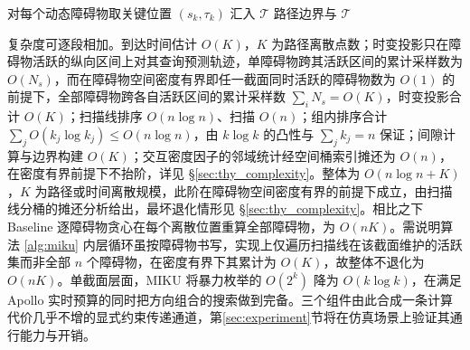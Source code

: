 \documentclass[a4paper,11pt]{ctexart}
\theoremstyle{definition}
\begin{document}
\begin{algorithm}[htbp]
\caption{MIKU 多障碍物统一规划求解}
\label{alg:miku}
对每个动态障碍物取关键位置 $(s_k, \tau_k)$ 汇入 $\mathcal{T}$\;
\KwRet 路径边界与 $\mathcal{T}$
\end{algorithm}

复杂度可逐段相加。到达时间估计 $O(K)$，$K$ 为路径离散点数；时变投影只在障碍物活跃的纵向区间上对其查询预测轨迹，单障碍物跨其活跃区间的累计采样数为 $O(N_s)$，而在障碍物空间密度有界即任一截面同时活跃的障碍物数为 $O(1)$ 的前提下，全部障碍物跨各自活跃区间的累计采样数 $\sum_i N_s = O(K)$，时变投影合计 $O(K)$；扫描线排序 $O(n\log n)$、扫描 $O(n)$；组内排序合计 $\sum_j O(k_j\log k_j)\leq O(n\log n)$，由 $k\log k$ 的凸性与 $\sum_j k_j = n$ 保证；间隙计算与边界构建 $O(K)$；交互密度因子的邻域统计经空间桶索引摊还为 $O(n)$，在密度有界前提下不抬阶，详见 §\ref{sec:thy_complexity}。整体为 $O(n\log n + K)$，$K$ 为路径或时间离散规模，此阶在障碍物空间密度有界的前提下成立，由扫描线分桶的摊还分析给出，最坏退化情形见 §\ref{sec:thy_complexity}。相比之下 Baseline 逐障碍物贪心在每个离散位置重算全部障碍物，为 $O(nK)$。需说明算法 \ref{alg:miku} 内层循环虽按障碍物书写，实现上仅遍历扫描线在该截面维护的活跃集而非全部 $n$ 个障碍物，在密度有界下其累计为 $O(K)$，故整体不退化为 $O(nK)$。单截面层面，MIKU 将暴力枚举的 $O(2^k)$ 降为 $O(k\log k)$，在满足 Apollo 实时预算的同时把方向组合的搜索做到完备。三个组件由此合成一条计算代价几乎不增的显式约束传递通道，第\ref{sec:experiment}节将在仿真场景上验证其通行能力与开销。

\makeatletter
{}
\makeatother
\end{document}
